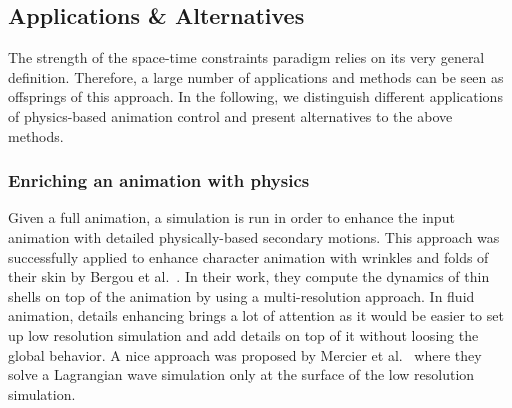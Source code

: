 \subsection{Applications \& Alternatives}
The strength of the space-time constraints paradigm relies on its very general definition. Therefore, a large number of applications and methods can be seen as offsprings of this approach. In the following, we distinguish different applications of physics-based animation control and present alternatives to the above methods.

\subsubsection{Enriching an animation with physics}
Given a full animation, a simulation is run in order to enhance the input animation with detailed physically-based secondary motions. This approach was successfully applied to enhance character animation with wrinkles and folds of their skin by Bergou et al.~\cite{Bergou2007}. In their work, they compute the dynamics of thin shells on top of the animation by using a multi-resolution approach. In fluid animation, details enhancing brings a lot of attention as it would be easier to set up low resolution simulation and add details on top of it without loosing the global behavior. A nice approach was proposed by Mercier et al.~\cite{Mercier2015} where they solve a Lagrangian wave simulation only at the surface of the low resolution simulation.

